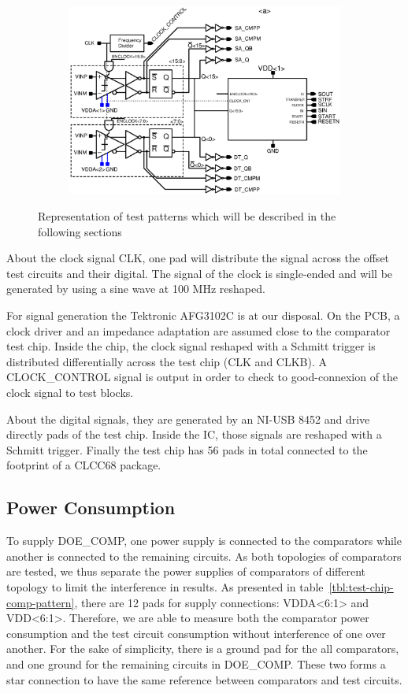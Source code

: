 \begin{figure}[htp]
\begin{subfigure}[b]{0.75\textwidth}
        \includegraphics[width=\textwidth]{Chapter5/Figs/comp_test/test_offset_conv_bloc.ps}
    \end{subfigure}
    \caption{Representation of test patterns which will be described in the following sections}
    \label{fig:test-chip-comp-patterns}
\end{figure}

About the clock signal CLK, one pad will distribute the signal across the offset test circuits and their digital. The signal of the clock is single-ended and will be generated by using a sine wave at 100 MHz reshaped.

For signal generation the Tektronic AFG3102C is at our disposal. On the PCB, a clock driver and an impedance adaptation are assumed close to the comparator test chip. Inside the chip, the clock signal reshaped with a Schmitt trigger is distributed differentially across the test chip (CLK and CLKB). A CLOCK\_CONTROL signal is output in order to check to good-connexion of the clock signal to test blocks.

About the digital signals, they are generated by an NI-USB 8452 and drive directly pads of the test chip. Inside the IC, those signals are reshaped with a Schmitt trigger. Finally the test chip has 56 pads in total connected to the footprint of a CLCC68 package.

\subsection{Power Consumption}
To supply DOE\_COMP, one power supply is connected to the comparators while another is connected to the remaining circuits.
As both topologies of comparators are tested, we thus separate the power supplies of comparators of different topology to limit the interference in results. As presented in table~\ref{tbl:test-chip-comp-pattern}, there are 12 pads for supply connections: VDDA<6:1> and VDD<6:1>. Therefore, we are able to measure both the comparator power consumption and the test circuit consumption without interference of one over another. For the sake of simplicity, there is a ground pad for the all comparators, and one ground for the remaining circuits in DOE\_COMP. These two forms a star connection to have the same reference between comparators and test circuits.

